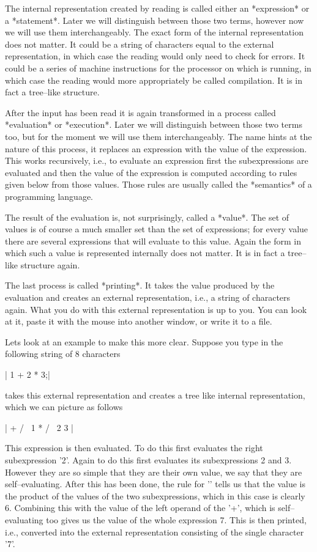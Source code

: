 The  internal  representation  created by  reading  is called  either  an
*expression* or a *statement*.   Later we  will distinguish between those
two terms, however now we will use them interchangeably.  The exact  form
of the internal  representation does not matter.  It could be a string of
characters  equal  to  the external  representation,  in  which case  the
reading  would  only  need to check for errors.  It could be a series  of
machine instructions  for the  processor  on  which {\GAP} is running, in
which case the reading would  more appropriately  be  called compilation.
It is in fact a tree--like structure.

After the input has been read it is again transformed in a process called
*evaluation* or *execution*.  Later we will distinguish between those two
terms too, but for the moment we will use them interchangeably.  The name
hints at the nature of this  process, it replaces an  expression with the
value of the expression.  This  works  recursively,  i.e., to evaluate an
expression  first the subexpressions  are evaluated and then the value of
the expression is  computed according  to rules  given  below from  those
values.  Those rules  are usually called the *semantics* of a programming
language.

The result of the evaluation is, not surprisingly, called a *value*.  The
set of values    is  of course a    much smaller  set  than  the   set of
expressions;  for  every value there  are   several expressions that will
evaluate to   this  value.  Again  the form  in  which such  a   value is
represented  internally does not   matter.  It is    in fact a tree--like
structure again.

The last process  is called *printing*.  It  takes the  value produced by
the evaluation and creates an external representation,  i.e., a string of
characters again.  What you do with this external representation is up to
you. You can look at it, paste it with the  mouse into another window, or
write it to a file.

Lets look at an example to make this more clear.  Suppose you type in the
following string of 8 characters

|    1 + 2 * 3;|

{\GAP}  takes   this external representation   and creates   a  tree like
internal representation, which we can picture as follows

|       +
      / \
     1   *
        / \
       2   3 |

This expression is then evaluated.  To do this {\GAP} first evaluates the
right subexpression '2'.   Again to do this {\GAP} first evaluates its
subexpressions 2  and 3.  However they  are so simple that they are their
own value, we say that  they are  self--evaluating.  After  this has been
done,  the rule for '\*' tells us that the value is the  product  of  the
values of the  two  subexpressions,  which  in  this case  is clearly  6.
Combining  this with the value  of the left operand of  the '+', which is
self--evaluating too gives us  the value of the whole expression 7.  This
is  then  printed,  i.e.,  converted  into  the  external  representation
consisting of the single character '7'.


